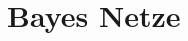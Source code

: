 \documentclass[a4paper]{article}
\title{\docTitle}
\author{Moritz}
\date{\today}
\begin{document}
\maketitle
\tableofcontents


\section{Bayes Netze}
\end{document}
